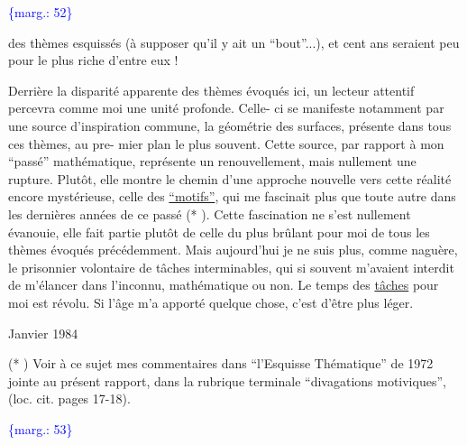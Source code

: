 \documentclass[11pt]{article}
\newcommand{\scanpage}[1]{\par\bigskip\noindent{\small\sffamily[scan #1]}\par}
\newcommand{\mspage}[1]{{\small\sffamily[p.\,#1]}}
\newcommand{\margin}[1]{\textcolor{blue}{\{\textsf{marg.:} #1\}}}
\newcommand{\uline}[1]{\underline{#1}}
\begin{document}
\margin{52}

\clearpage
\scanpage{119/53}
\mspage{51}

des thèmes esquissés (à supposer qu'il y ait un ``bout''...), et
cent ans seraient peu pour le plus riche d'entre eux !

Derrière la disparité apparente des thèmes évoqués ici,
un lecteur attentif percevra comme moi une unité profonde. Celle-%
ci se manifeste notamment par une source d'inspiration commune,
la géométrie des surfaces, présente dans tous ces thèmes, au pre-%
mier plan le plus souvent. Cette source, par rapport à mon ``passé''
mathématique, représente un renouvellement, mais nullement une
rupture. Plutôt, elle montre le chemin d'une approche nouvelle
vers cette réalité encore mystérieuse, celle des \uline{``motifs''}, qui me
fascinait plus que toute autre dans les dernières années de ce
passé (* ). Cette fascination ne s'est nullement évanouie,
elle fait partie plutôt de celle du plus brûlant pour moi de tous
les thèmes évoqués précédemment. Mais aujourd'hui je ne suis plus,
comme naguère, le prisonnier volontaire de tâches interminables,
qui si souvent m'avaient interdit de m'élancer dans l'inconnu,
mathématique ou non. Le temps des \uline{tâches} pour moi est révolu. Si
l'âge m'a apporté quelque chose, c'est d'être plus léger.

Janvier 1984

(* ) Voir à ce sujet mes commentaires dans ``l'Esquisse Thématique''
de 1972 jointe au présent rapport, dans la rubrique terminale
``divagations motiviques'', (loc. cit. pages 17-18).

\margin{53}

\clearpage
\scanpage{119/54}
\mspage{52}
\end{document}
